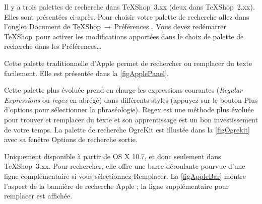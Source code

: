 \documentclass[11pt,french]{article}
\newcommand{\TS}{\textsf{\TeX Shop}}
\newcommand{\acr}[1]{\textsf{#1}}
\newcommand{\cmd}[1]{\textsf{#1}}
\newcommand{\mnu}[1]{\textsf{#1}}
\newcommand{\To}{\,\(\to\)\,}
\begin{document}
Il y a trois palettes de recherche dans \TS\ 3.xx (deux dans \TS\ 2.xx). Elles sont présentées ci-après. Pour choisir votre palette de recherche allez dans l'onglet \mnu{Document} de \mnu{TeXShop}\To\mnu{Préférences…} Vous devez redémarrer \TS\ pour activer les modifications apportées dans le choix de palette de recherche dans les \mnu{Préférences…}
\begin{description}[leftmargin=\parindent]
\item[Palette de recherche Apple]
Cette palette traditionnelle d'Apple permet de rechercher ou remplacer du texte facilement. Elle est présentée dans la \vref{figApplePanel}. %
\item[Palette de recherche OgreKit]
Cette palette plus évoluée prend en charge les expressions courantes (\emph{Regular Expressions} ou \emph{\acr{regex}} en abrégé) dans différents styles (appuyez sur le bouton \mnu{Plus d'options} pour sélectionner la phraséologie). \acr{Regex} est une méthode plus évoluée pour trouver et remplacer du texte et son apprentissage est un bon investissement de votre temps. La palette de recherche OgreKit est illustée dans la \vref{figOgrekit} avec sa fenêtre \cmd{Options de recherche} sortie.
\item[Bannière de recherche Apple]
Uniquement disponible à partir de \cmd{OS X 10.7}, et donc seulement dans \acr{\TS\ 3.xx}. Pour rechercher, elle offre une barre déroulante pourvue d'une ligne complémentaire si vous sélectionnez \mnu{Remplacer}. La \vref{figAppleBar} montre l'aspect de la bannière de recherche Apple ; la ligne supplémentaire pour remplacer est affichée.
\end{description}
\end{document}
